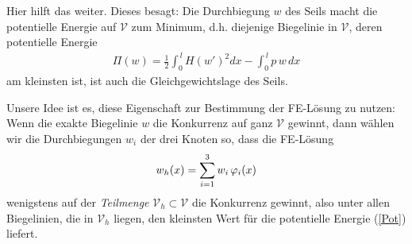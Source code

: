 Hier hilft das  weiter. Dieses besagt: Die Durchbiegung $w$ des Seils macht die potentielle Energie auf $\mathcal{V}$ zum Minimum, d.h. diejenige Biegelinie in $\mathcal{V}$, deren potentielle Energie
\begin{align}\label{Pot} \Pi(w) = \frac{1}{2}
\int_0^{\,l} H (w')^2 dx - \int_0^{\,l} p \, w\, dx
\end{align}
am kleinsten ist, ist auch die Gleichgewichtslage des Seils.

Unsere Idee ist es, diese Eigenschaft zur Bestimmung der FE-L\"{o}sung zu nutzen: Wenn die exakte Biegelinie $w$ die Konkurrenz auf ganz $\mathcal{V}$ gewinnt, dann w\"{a}hlen wir die Durchbiegungen
$w_i$ der drei Knoten so, dass die FE-L\"{o}sung
\begin{align}\label{Ansatz}
w_{h}(x) = \sum_{i=1}^3 w_i \, \varphi_i(x)
\end{align}
wenigstens auf der {\em Teilmenge} $\mathcal{V}_{h} \subset \mathcal{V}$ die Konkurrenz gewinnt, also unter allen Biegelinien, die in $\mathcal{V}_{h}$ liegen, den kleinsten Wert f\"{u}r die potentielle Energie (\ref{Pot}) liefert.

